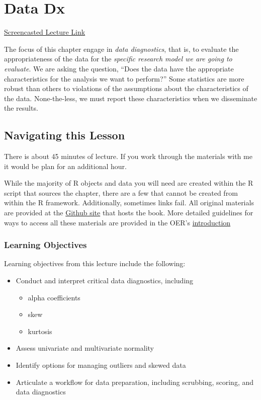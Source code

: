 \documentclass[
  english,
]{book}
\providecommand{\tightlist}{%
  \setlength{\itemsep}{0pt}\setlength{\parskip}{0pt}}
\begin{document}
\hypertarget{DataDx}{%
\chapter{Data Dx}\label{DataDx}}

\href{https://spu.hosted.panopto.com/Panopto/Pages/Viewer.aspx?pid=43dbe818-8186-498d-8e84-acf7000acb5b}{Screencasted Lecture Link}

The focus of this chapter engage in \emph{data diagnostics}, that is, to evaluate the appropriateness of the data for the \emph{specific research model we are going to evaluate}. We are asking the question, ``Does the data have the appropriate characteristics for the analysis we want to perform?'' Some statistics are more robust than others to violations of the assumptions about the characteristics of the data. None-the-less, we must report these characteristics when we disseminate the results.

\hypertarget{navigating-this-lesson-2}{%
\section{Navigating this Lesson}\label{navigating-this-lesson-2}}

There is about 45 minutes of lecture. If you work through the materials with me it would be plan for an additional hour.

While the majority of R objects and data you will need are created within the R script that sources the chapter, there are a few that cannot be created from within the R framework. Additionally, sometimes links fail. All original materials are provided at the \href{https://github.com/lhbikos/ReC_MultivModel}{Github site} that hosts the book. More detailed guidelines for ways to access all these materials are provided in the OER's \protect\hyperlink{ReCintro}{introduction}

\hypertarget{learning-objectives-2}{%
\subsection{Learning Objectives}\label{learning-objectives-2}}

Learning objectives from this lecture include the following:

\begin{itemize}
\tightlist
\item
  Conduct and interpret critical data diagnostics, including

  \begin{itemize}
  \tightlist
  \item
    alpha coefficients
  \item
    skew
  \item
    kurtosis
  \end{itemize}
\item
  Assess univariate and multivariate normality
\item
  Identify options for managing outliers and skewed data
\item
  Articulate a workflow for data preparation, including scrubbing, scoring, and data diagnostics
\end{itemize}
\end{document}
